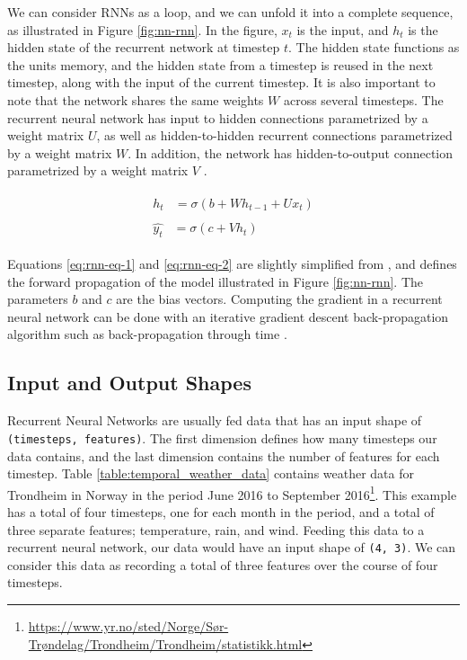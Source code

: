 We can consider RNNs as a loop, and we can unfold it into a complete sequence, as illustrated in Figure \ref{fig:nn-rnn}. In the figure, \(x_{t}\) is the input, and \(h_{t}\) is the hidden state of the recurrent network at timestep \(t\). The hidden state functions as the units memory, and the hidden state from a timestep is reused in the next timestep, along with the input of the current timestep. It is also important to note that the network shares the same weights \(W\) across several timesteps. The recurrent neural network has input to hidden connections parametrized by a weight matrix \(U\), as well as hidden-to-hidden recurrent connections parametrized by a weight matrix \(W\). In addition, the network has hidden-to-output connection parametrized by a weight matrix \(V\) \citep{goodfellow2016deeplearning}.

\begin{align}
    \begin{split}\label{eq:rnn-eq-1}
        h_{t}&=\sigma(b+Wh_{t-1}+Ux_{t})
    \end{split}\\
    \begin{split}\label{eq:rnn-eq-2}
        \hat{y_{t}}&=\sigma(c+Vh_{t})
    \end{split}
\end{align}

Equations \ref{eq:rnn-eq-1} and \ref{eq:rnn-eq-2} are slightly simplified from \citep{goodfellow2016deeplearning}, and defines the forward propagation of the model illustrated in Figure \ref{fig:nn-rnn}. The parameters \(b\) and \(c\) are the bias vectors. Computing the gradient in a recurrent neural network can be done with an iterative gradient descent back-propagation algorithm such as back-propagation through time \citep{werbos1990backpropagation}. 

\subsection{Input and Output Shapes}
\label{sec:input_and_output_shapes}
Recurrent Neural Networks are usually fed data that has an input shape of {\tt (timesteps, features)}. The first dimension defines how many timesteps our data contains, and the last dimension contains the number of features for each timestep. Table \ref{table:temporal_weather_data} contains weather data for Trondheim in Norway in the period June 2016 to September 2016\footnote{\url{https://www.yr.no/sted/Norge/Sør-Trøndelag/Trondheim/Trondheim/statistikk.html}}. This example has a total of four timesteps, one for each month in the period, and a total of three separate features; temperature, rain, and wind. Feeding this data to a recurrent neural network, our data would have an input shape of {\tt (4, 3)}. We can consider this data as recording a total of three features over the course of four timesteps.

